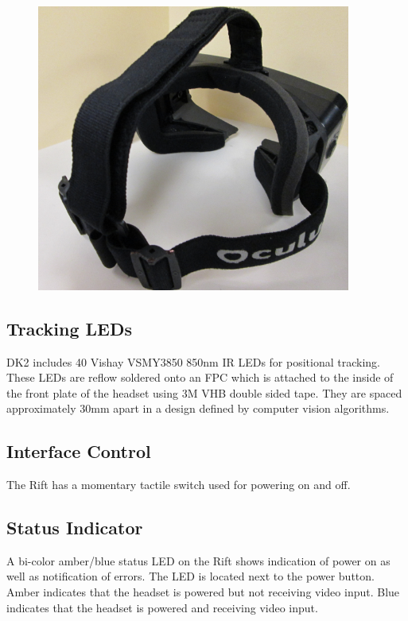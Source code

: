 \documentclass[letterpaper]{article}
\begin{document}
\begin{figure}[H]  
  \centering
    \includegraphics[width=0.92\textwidth]{Figures/image4-21.png}
\end{figure}

\subsection{Tracking LEDs}
DK2 includes 40 Vishay VSMY3850 850nm IR LEDs for positional tracking. These LEDs are reflow soldered onto an FPC which is attached to the inside of the front plate of the headset using 3M VHB double sided tape. They are spaced approximately 30mm apart in a design defined by computer vision algorithms.

\newpage

\subsection{Interface Control}
The Rift has a momentary tactile switch used for powering on and off.

\subsection{Status Indicator}
A bi-color amber/blue status LED on the Rift shows indication of power on as well as notification of errors.  The LED is located next to the power button.  Amber indicates that the headset is powered but not receiving video input.  Blue indicates that the headset is powered and receiving video input.
\end{document}
